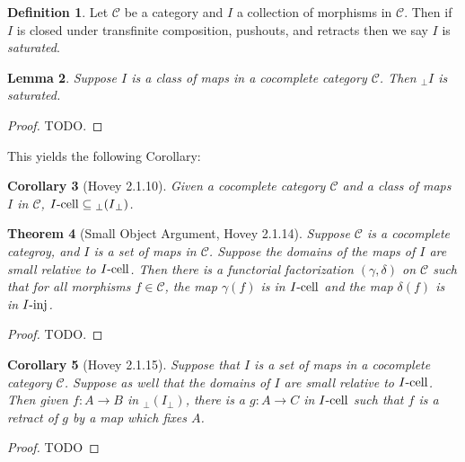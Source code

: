 \documentclass{amsart}
\theoremstyle{plain}
\newtheorem{theorem}{Theorem}[section]
\newtheorem{corollary}[theorem]{Corollary}
\newtheorem{lemma}[theorem]{Lemma}
\theoremstyle{definition}
\newtheorem{definition}[theorem]{Definition}
\newcommand{\sseq}{\subseteq}
\newcommand{\0}{\mathbf{0}}
\newcommand{\cC}{\mathcal C}
\newcommand{\p}{{_\perp}}
\renewcommand{\(}{\left(}
\renewcommand{\)}{\right)}
\newcommand{\inj}{\text-\mathrm{inj}}
\newcommand{\cell}{\text-\mathrm{cell}}
\begin{document}
\begin{definition}\label{saturated}
  Let $\cC$ be a category and $I$ a collection of morphisms in $\cC$. Then if $I$ is closed under transfinite composition, pushouts, and retracts then we say $I$ is \textit{saturated}.
\end{definition}

\begin{lemma}
  Suppose $I$ is a class of maps in a cocomplete category $\cC$. Then $\p I$ is saturated. 
\end{lemma}
\begin{proof}
  \color{red}TODO.
\end{proof}

This yields the following Corollary:

\begin{corollary}[Hovey 2.1.10]\label{2.1.10}
  Given a cocomplete category $\cC$ and a class of maps $I$ in $\cC$, $I\cell\sseq{\p(I\p)}$.
\end{corollary}

\begin{theorem}[Small Object Argument, Hovey 2.1.14]\label{2.1.14}
  Suppose $\cC$ is a cocomplete categroy, and $I$ is a set of maps in $\cC$. Suppose the domains of the maps of $I$ are small relative to $I\cell$. Then there is a functorial factorization $(\gamma,\delta)$ on $\cC$ such that for all morphisms $f\in\cC$, the map $\gamma(f)$ is in $I\cell$ and the map $\delta(f)$ is in $I\inj$.
\end{theorem}
\begin{proof}
  \color{red}TODO.
\end{proof}

\begin{corollary}[Hovey 2.1.15]\label{2.1.15}
  Suppose that $I$ is a set of maps in a cocomplete category $\cC$. Suppose as well that the domains of $I$ are small relative to $I\cell$. Then given $f:A\to B$ in $\p(I\p)$, there is a $g:A\to C$ in $I\cell$ such that $f$ is a retract of $g$ by a map which fixes $A$.
\end{corollary}
\begin{proof}
  \color{red}TODO
\end{proof}
\end{document}
